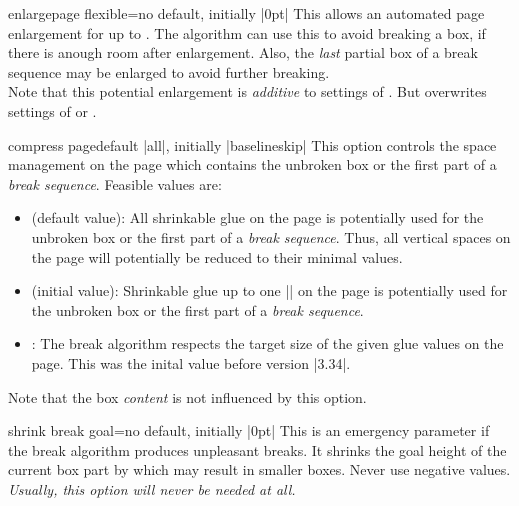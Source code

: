 \clearpage
\begin{docTcbKey}{enlargepage flexible}{=}{no default, initially |0pt|}
  This allows an automated page enlargement for up to .
  The algorithm can use this to avoid breaking a box, if there is anough room
  after enlargement. Also, the \emph{last} partial box of a break sequence
  may be enlarged to avoid further breaking.\\
  Note that this potential enlargement is \emph{additive} to settings of
  .
  But  overwrites settings of
   or .
\begin{dispListing}
\end{dispListing}
\end{docTcbKey}


\begin{docTcbKey}[][doc new=2014-12-15]{compress page}{}{default |all|, initially |baselineskip|}
  This option controls the space management on the page which contains the
  unbroken box or the first part of a \emph{break sequence}.
  Feasible  values are:
  \begin{itemize}
  \item{} (default value):
    All shrinkable glue on the page is potentially used for the
    unbroken box or the first part of a \emph{break sequence}. Thus, all
    vertical spaces on the page will potentially be reduced to their
    minimal values.
  \item{} (initial value):
    Shrinkable glue up to one |\baselineskip| on the page is potentially used for the
    unbroken box or the first part of a \emph{break sequence}.
  \item{}:
    The break algorithm respects the target size of the given glue values
    on the page. This was the inital value before version |3.34|.
  \end{itemize}
  \begin{marker}
  Note that the box \emph{content} is not influenced by this option.
  \end{marker}
\end{docTcbKey}


\begin{docTcbKey}{shrink break goal}{=}{no default, initially |0pt|}
  This is an emergency parameter if the break algorithm produces unpleasant
  breaks.
  It shrinks the goal height of the current box part by 
  which may result in smaller boxes. Never use negative values.
  \emph{Usually, this option will never be needed at all.}
\end{docTcbKey}


